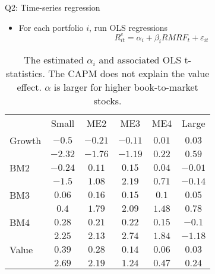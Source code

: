 \documentclass[10pt,t]{beamer}
\begin{document}
\begin{frame}{Q2: Time-series regression}
\begin{itemize}
  \item For each portfolio $i$, run OLS regressions
  $$
  R_{it}^e = \alpha_i + \beta_i RMRF_t + \varepsilon_{it}
  $$
\end{itemize}
\begin{table}
\begin{tabular}{lccccc}
\toprule
 & Small & ME2 & ME3 & ME4 & Large \\
\cmidrule{1-6}
Growth & $-0.5$ & $-0.21$ & $-0.11$ & $0.01$ & $0.03$\\
& $-2.32$ & $-1.76$ & $-1.19$ & $0.22$ & $0.59$ \\
BM2 & $-0.24$ & $0.11$ & $0.15$ & $0.04$ & $-0.01$\\
& $-1.5$ & $1.08$ & $2.19$ & $0.71$ & $-0.14$ \\
BM3 & $0.06$ & $0.16$ & $0.15$ & $0.1$ & $0.05$\\
& $0.4$ & $1.79$ & $2.09$ & $1.48$ & $0.78$ \\
BM4 & $0.28$ & $0.21$ & $0.22$ & $0.15$ & $-0.1$\\
& $2.25$ & $2.13$ & $2.74$ & $1.84$ & $-1.18$ \\
Value & $0.39$ & $0.28$ & $0.14$ & $0.06$ & $0.03$\\
& $2.69$ & $2.19$ & $1.24$ & $0.47$ & $0.24$ \\
\bottomrule
\end{tabular}
\caption{The estimated $\alpha_i$ and associated OLS t-statistics. The CAPM does not explain the value effect. $\alpha$ is larger for higher book-to-market stocks.}
\end{table}
\end{frame}
\end{document}
